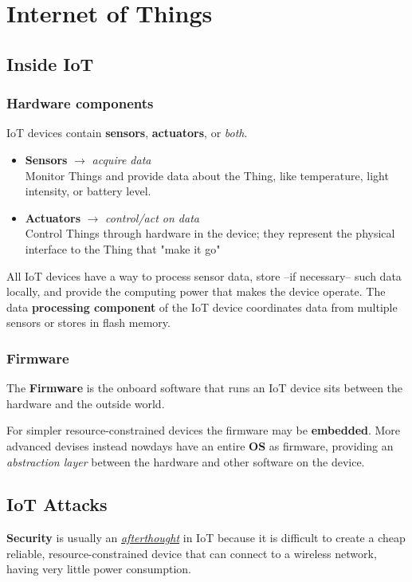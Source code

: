 \chapter{Internet of Things}

\section{Inside IoT}
\subsection{Hardware components}
IoT devices contain \textbf{sensors}, \textbf{actuators}, or \textit{both}.
\begin{itemize}
   \item \textbf{Sensors} $\longrightarrow$ \textit{acquire data}\\
   Monitor Things and provide data about the Thing, like temperature, light intensity, or battery level.
   \item \textbf{Actuators} $\longrightarrow$ \textit{control/act on data}\\
   Control Things through hardware in the device;
   they represent the physical
   interface to the Thing that "make it go"
\end{itemize}

All IoT devices have a way to process sensor data, store {--}if necessary{--} such data locally, and provide the computing power that makes the device
operate.
The data \textbf{processing component} of the IoT device coordinates data from multiple sensors or stores in flash memory.

\subsection{Firmware}
The \textbf{Firmware} is the onboard software that runs an IoT device sits between the
hardware and the outside world.

For simpler resource-constrained devices the firmware may be \textbf{embedded}.
More advanced devises instead nowdays have an entire \textbf{OS} as firmware, providing an
\textit{abstraction layer} between the hardware and other software on the device.

\section{IoT Attacks}
\textbf{Security} is usually an \textit{\underline{afterthought}} in IoT because it is difficult to create a cheap reliable, resource-constrained device that can connect to a wireless network, having very little power consumption.

